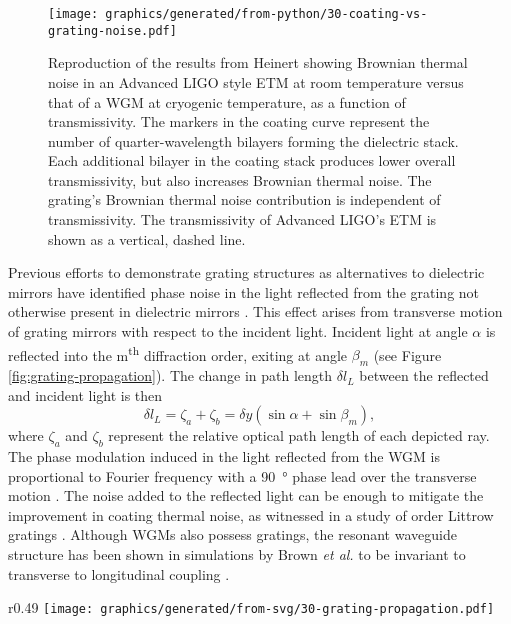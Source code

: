 \begin{figure}
  \centering
  \texttt{[image: graphics/generated/from-python/30-coating-vs-grating-noise.pdf]}
  \caption{\label{fig:coating-vs-grating-noise}Reproduction of the results from Heinert \etal{} \cite{Heinert2013} showing Brownian thermal noise in an Advanced LIGO style \gls{ETM} at room temperature versus that of a \gls{WGM} at cryogenic temperature, as a function of transmissivity. The markers in the coating curve represent the number of quarter-wavelength bilayers forming the dielectric stack. Each additional bilayer in the coating stack produces lower overall transmissivity, but also increases Brownian thermal noise. The grating's Brownian thermal noise contribution is independent of transmissivity. The transmissivity of Advanced LIGO's ETM is shown as a vertical, dashed line.}
\end{figure}

Previous efforts to demonstrate grating structures as alternatives to dielectric mirrors have identified phase noise in the light reflected from the grating not otherwise present in dielectric mirrors \cite{Wise2005, Freise2007}. This effect arises from transverse motion of grating mirrors with respect to the incident light. Incident light at angle $\alpha$ is reflected into the m\textsuperscript{th} diffraction order, exiting at angle $\beta_m$ (see Figure\,\ref{fig:grating-propagation}). The change in path length $\delta l_L$ between the reflected and incident light is then
\begin{equation}
  \delta l_L = \zeta_a + \zeta_b = \delta y
  \left( \sin{\alpha} + \sin{\beta_m} \right),
\end{equation}
where $\zeta_a$ and $\zeta_b$ represent the relative optical path length of each depicted ray.
The phase modulation induced in the light reflected from the \gls{WGM} is proportional to Fourier frequency with a \SI{90}{\degree} phase lead over the transverse motion \cite{Barr2011}. The noise added to the reflected light can be enough to mitigate the improvement in coating thermal noise, as witnessed in a study of  order Littrow gratings \cite{Barr2011}. Although \glspl{WGM} also possess gratings, the resonant waveguide structure has been shown in simulations by Brown \emph{et al.} to be invariant to transverse to longitudinal coupling \cite{Brown2013}.

\begin{wrapfigure}{r}{0.49\textwidth}
  \centering
  \texttt{[image: graphics/generated/from-svg/30-grating-propagation.pdf]}
  \caption{\label{fig:grating-propagation}Optical path length changes $\zeta_a$ and $\zeta_b$ due to transverse motion of a Littrow grating. Incident light diffracted into a different order undergoes a path length change $\delta l_L = \zeta_a + \zeta_b$.}
\end{wrapfigure}
  
